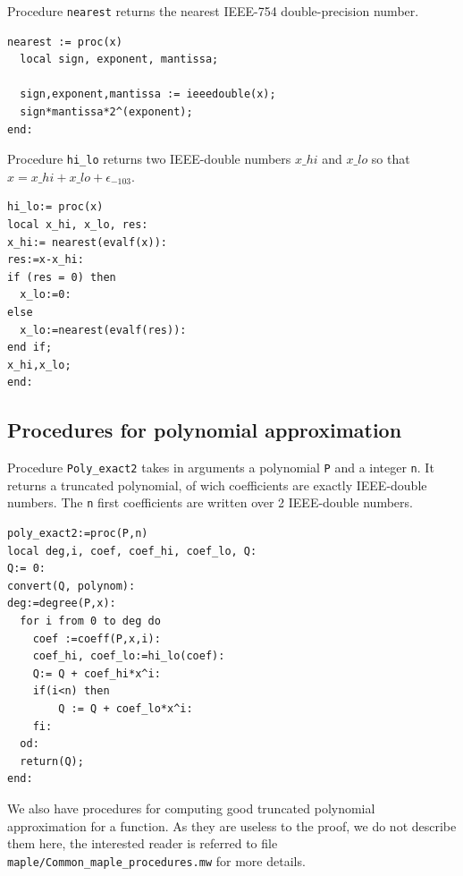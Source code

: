 Procedure \texttt{nearest} returns the nearest IEEE-754 double-precision number.
\begin{lstlisting}[caption={nearest},firstnumber=1]
nearest := proc(x)
  local sign, exponent, mantissa;

  sign,exponent,mantissa := ieeedouble(x);
  sign*mantissa*2^(exponent);
end:
\end{lstlisting}



Procedure \texttt{hi\_lo} returns two IEEE-double numbers $x\_hi$ and $x\_lo$ so that $x = x\_hi + x\_lo + \epsilon_{-103}$.

\begin{lstlisting}[caption={hi\_lo},firstnumber=1]
hi_lo:= proc(x)
local x_hi, x_lo, res:
x_hi:= nearest(evalf(x)):
res:=x-x_hi:
if (res = 0) then
  x_lo:=0:
else
  x_lo:=nearest(evalf(res)):
end if;
x_hi,x_lo;
end:
\end{lstlisting}
\vspace{0.5cm}




\subsection{Procedures for polynomial approximation}


Procedure \texttt{Poly\_exact2} takes in arguments a polynomial \texttt{P} and a
integer \texttt{n}. It returns a truncated polynomial, of wich coefficients
are exactly IEEE-double numbers. The \texttt{n} first coefficients are written
over 2 IEEE-double numbers.

\begin{lstlisting}[caption={poly\_exact2},firstnumber=1]
poly_exact2:=proc(P,n)
local deg,i, coef, coef_hi, coef_lo, Q:
Q:= 0:
convert(Q, polynom):
deg:=degree(P,x):
  for i from 0 to deg do
    coef :=coeff(P,x,i):
    coef_hi, coef_lo:=hi_lo(coef):
    Q:= Q + coef_hi*x^i:
    if(i<n) then
        Q := Q + coef_lo*x^i:
    fi:
  od:
  return(Q);
end:
\end{lstlisting}
\vspace{0.5cm}


We also have procedures for computing good truncated polynomial
approximation for a function. As they are useless to the proof, we do
not describe them here, the interested reader is referred to file
\texttt{maple/Common\_maple\_procedures.mw} for more details.











